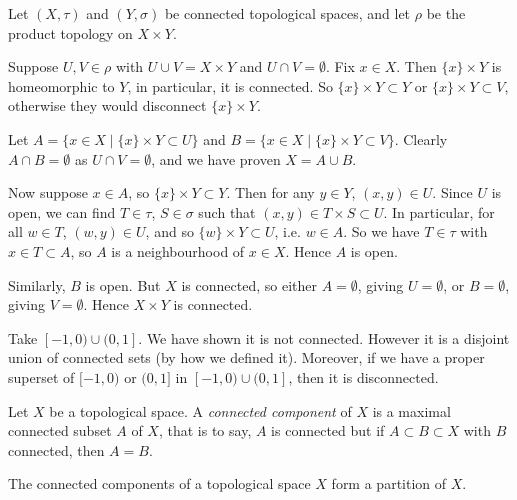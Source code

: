 \documentclass[12pt]{article}
\begin{document}
\begin{proofbox}
	Let $(X, \tau)$ and $(Y, \sigma)$ be connected topological spaces, and let $\rho$ be the product topology on $X \times Y$.

	Suppose $U, V \in \rho$ with $U \cup V = X \times Y$ and $U \cap V = \emptyset$. Fix $x \in X$. Then $\{x\} \times Y$ is homeomorphic to $Y$, in particular, it is connected. So $\{x\} \times Y \subset Y$ or $\{x\} \times Y \subset V$, otherwise they would disconnect $\{x\} \times Y$.

	Let $A = \{x \in X \mid \{x\} \times Y \subset U\}$ and $B = \{x \in X \mid \{x\} \times Y \subset V\}$. Clearly $A \cap B = \emptyset$ as $U \cap V = \emptyset$, and we have proven $X = A \cup B$.

	Now suppose $x \in A$, so $\{x\} \times Y \subset Y$. Then for any $y \in Y$, $(x, y) \in U$. Since $U$ is open, we can find $T \in \tau$, $S \in \sigma$ such that $(x, y) \in T \times S \subset U$. In particular, for all $w \in T$, $(w, y) \in U$, and so $\{w\} \times Y \subset U$, i.e. $w \in A$. So we have $T \in \tau$ with $x \in T \subset A$, so $A$ is a neighbourhood of $x \in X$. Hence $A$ is open.

	Similarly, $B$ is open. But $X$ is connected, so either $A = \emptyset$, giving $U = \emptyset$, or $B = \emptyset$, giving $V = \emptyset$. Hence $X \times Y$ is connected.
\end{proofbox}

\begin{exbox}
	Take $[-1, 0) \cup (0, 1]$. We have shown it is not connected. However it is a disjoint union of connected sets (by how we defined it). Moreover, if we have a proper superset of $[-1, 0)$ or $(0, 1]$ in $[-1, 0) \cup (0, 1]$, then it is disconnected.
\end{exbox}

\begin{definition}
	Let $X$ be a topological space. A \textit{connected component} of $X$ is a maximal connected subset $A$ of $X$, that is to say, $A$ is connected but if $A \subset B \subset X$ with $B$ connected, then $A = B$.
\end{definition}

\begin{theorem}
	The connected components of a topological space $X$ form a partition of $X$.
\end{theorem}
\end{document}
